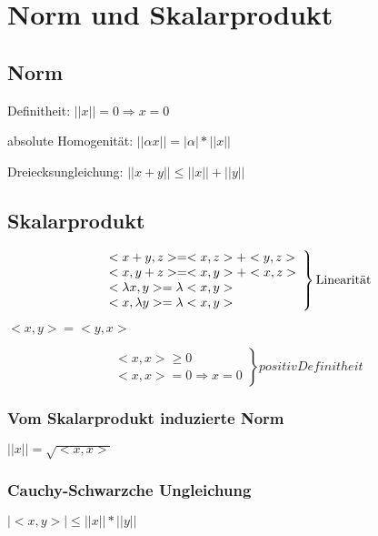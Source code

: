 \documentclass[12pt,a4paper]{article} %
\begin{document}
	\tableofcontents %
	\newpage %
	\section{Norm und Skalarprodukt}
	
	
	\subsection{Norm}
	Definitheit: $||x|| = 0 \Rightarrow x = 0$
		
	absolute Homogenität: $||\alpha x|| = |\alpha| * ||x||$
	
	Dreiecksungleichung: $||x + y|| \le ||x|| + ||y||$
	
	\subsection{Skalarprodukt}
	
	\[
		\left.
			\begin{array}{l}
				<x + y, z> = <x, z> + <y, z> \\
				<x, y + z> = <x, y> + <x, z> \\
				<\lambda x, y> = \lambda <x, y> \\
				<x, \lambda y> = \lambda <x, y>
			\end{array}
		\right \} \textnormal{Linearität}
	\]
	
	\begin{math}
		<x, y> = <y, x>
	\end{math}
	
	\[
		\left.
			\begin{array}{l}
				<x, x> \ge 0 \\
				<x, x> = 0 \Rightarrow x = 0
			\end{array}
		\right \} positiv Definitheit
	\]
	
	
	\subsubsection{Vom Skalarprodukt induzierte Norm}
	$||x|| = \sqrt{<x, x>}$
	
	\subsubsection{Cauchy-Schwarzche Ungleichung}
	$|<x, y>| \le ||x||*||y||$
		
\end{document}
